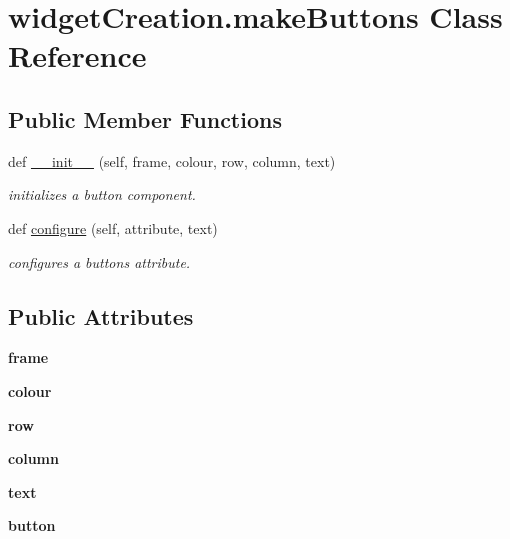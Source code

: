 \hypertarget{classwidget_creation_1_1make_buttons}{}\section{widget\+Creation.\+make\+Buttons Class Reference}
\label{classwidget_creation_1_1make_buttons}
\subsection*{Public Member Functions}
\begin{DoxyCompactItemize}
\item 
def \hyperlink{classwidget_creation_1_1make_buttons_ad1061e56880f1434230600c2d7879482}{\+\_\+\+\_\+init\+\_\+\+\_\+} (self, frame, colour, row, column, text)
\begin{DoxyCompactList}\small\item\em initializes a button component. \end{DoxyCompactList}\item 
def \hyperlink{classwidget_creation_1_1make_buttons_a46d1df511c7c60d021bb21f74cad8371}{configure} (self, attribute, text)
\begin{DoxyCompactList}\small\item\em configures a buttons attribute. \end{DoxyCompactList}\end{DoxyCompactItemize}
\subsection*{Public Attributes}
\begin{DoxyCompactItemize}
\item 
\mbox{\label{classwidget_creation_1_1make_buttons_a639739da7c29e522688cfd0754bf4e61}} 
{\bfseries frame}
\item 
\mbox{\label{classwidget_creation_1_1make_buttons_a800110334f27a9fbf61b3068b35a4ddf}} 
{\bfseries colour}
\item 
\mbox{\label{classwidget_creation_1_1make_buttons_ae53842f557f5bde55662162d5de6dad1}} 
{\bfseries row}
\item 
\mbox{\label{classwidget_creation_1_1make_buttons_afaabe1fd53ca14f92c3e7f24b1e4ab8e}} 
{\bfseries column}
\item 
\mbox{\label{classwidget_creation_1_1make_buttons_a6f340ce4f68853b58d0a027ad229f802}} 
{\bfseries text}
\item 
\mbox{\label{classwidget_creation_1_1make_buttons_acccdfc6e08c2a5fbbebe05bb80cbf7cc}} 
{\bfseries button}
\end{DoxyCompactItemize}


